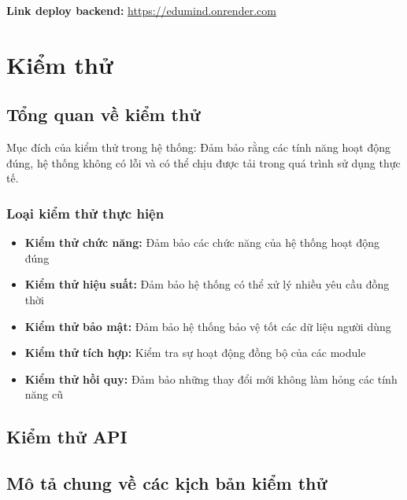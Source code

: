 \par \textbf{Link deploy backend:} \textcolor{blue}{\href{https://edumind.onrender.com}{https://edumind.onrender.com}}



\section{Kiểm thử}

\subsection{Tổng quan về kiểm thử}

Mục đích của kiểm thử trong hệ thống: Đảm bảo rằng các tính năng hoạt động đúng, hệ thống không có lỗi và có thể chịu được tải trong quá trình sử dụng thực tế.

\subsubsection{Loại kiểm thử thực hiện}
\begin{itemize}
    \item \textbf{Kiểm thử chức năng:} Đảm bảo các chức năng của hệ thống hoạt động đúng
    \item \textbf{Kiểm thử hiệu suất:} Đảm bảo hệ thống có thể xử lý nhiều yêu cầu đồng thời
    \item \textbf{Kiểm thử bảo mật:} Đảm bảo hệ thống bảo vệ tốt các dữ liệu người dùng
    \item \textbf{Kiểm thử tích hợp:} Kiểm tra sự hoạt động đồng bộ của các module
    \item \textbf{Kiểm thử hồi quy:} Đảm bảo những thay đổi mới không làm hỏng các tính năng cũ
\end{itemize}

\subsection{Kiểm thử API}

\subsection{Mô tả chung về các kịch bản kiểm thử}

